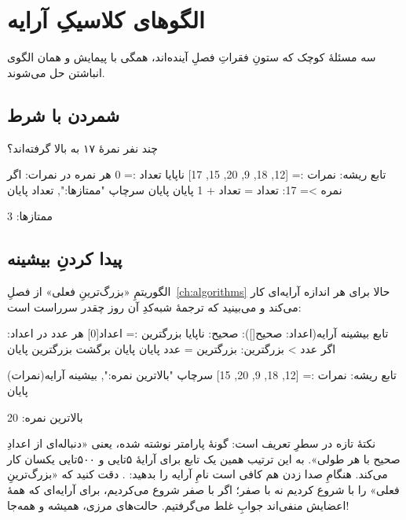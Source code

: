 \section{الگوهای کلاسیکِ آرایه}

سه مسئلهٔ کوچک که ستونِ فقراتِ فصلِ آینده‌اند، همگی با پیمایش و همان الگوی
انباشتن حل می‌شوند.

\subsection{شمردن با شرط}

چند نفر نمرهٔ ۱۷ به بالا گرفته‌اند؟

\begin{salamfa}
تابع ریشه:
    نمرات := [12, 18, 9, 20, 15, 17]
    ناپایا تعداد := 0
    هر نمره در نمرات:
        اگر نمره >= 17:
            تعداد = تعداد + 1
        پایان
    پایان
    سرچاپ "ممتازها:", تعداد
پایان
\end{salamfa}

\begin{progoutfa}
ممتازها: 3
\end{progoutfa}

\subsection{پیدا کردنِ بیشینه}

الگوریتمِ «بزرگ‌ترینِ فعلی» از فصلِ~\ref{ch:algorithms} حالا برای هر
اندازه آرایه‌ای کار می‌کند و می‌بینید که ترجمهٔ شبه‌کدِ آن روز چقدر
سرراست است:

\begin{salamfa}
تابع بیشینه آرایه(اعداد: صحیح[]): صحیح:
    ناپایا بزرگترین := اعداد[0]
    هر عدد در اعداد:
        اگر عدد > بزرگترین:
            بزرگترین = عدد
        پایان
    پایان
    برگشت بزرگترین
پایان

تابع ریشه:
    نمرات := [12, 18, 9, 20, 15]
    سرچاپ "بالاترین نمره:", بیشینه آرایه(نمرات)
پایان
\end{salamfa}

\begin{progoutfa}
بالاترین نمره: 20
\end{progoutfa}

نکتهٔ تازه در سطرِ تعریف است: گونهٔ پارامتر  نوشته شده، یعنی
«دنباله‌ای از اعدادِ صحیح با هر طولی». به این ترتیب همین یک تابع برای
آرایهٔ ۵تایی و ۵۰۰تایی یکسان کار می‌کند. هنگامِ صدا زدن هم کافی است نامِ
آرایه را بدهید: . دقت کنید که «بزرگ‌ترینِ فعلی» را
با  شروع کردیم نه با صفر؛ اگر با صفر شروع می‌کردیم، برای
آرایه‌ای که همهٔ اعضایش منفی‌اند جوابِ غلط می‌گرفتیم. حالت‌های مرزی،
همیشه و همه‌جا!

